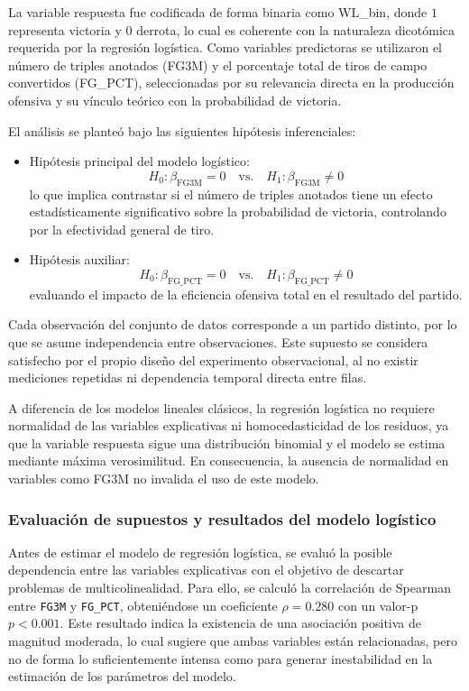 \documentclass[12pt]{article}
\begin{document}
La variable respuesta fue codificada de forma binaria como
WL\_bin, donde $1$ representa victoria y $0$ derrota, lo cual es
coherente con la naturaleza dicotómica requerida por la regresión logística.
Como variables predictoras se utilizaron el número de triples anotados
(FG3M) y el porcentaje total de tiros de campo convertidos
(FG\_PCT), seleccionadas por su relevancia directa en la producción
ofensiva y su vínculo teórico con la probabilidad de victoria.


El análisis se planteó bajo las siguientes hipótesis inferenciales:

\begin{itemize}
    \item Hipótesis principal del modelo logístico:
    \[
    H_0: \beta_{\text{FG3M}} = 0 \quad \text{vs.} \quad H_1: \beta_{\text{FG3M}} \neq 0
    \]
    lo que implica contrastar si el número de triples anotados tiene un efecto
    estadísticamente significativo sobre la probabilidad de victoria,
    controlando por la efectividad general de tiro.

    \item Hipótesis auxiliar:
    \[
    H_0: \beta_{\text{FG\_PCT}} = 0 \quad \text{vs.} \quad H_1: \beta_{\text{FG\_PCT}} \neq 0
    \]
    evaluando el impacto de la eficiencia ofensiva total en el resultado del
    partido.
\end{itemize}

Cada observación del conjunto de datos corresponde a un partido distinto,
por lo que se asume independencia entre observaciones. Este supuesto se
considera satisfecho por el propio diseño del experimento observacional,
al no existir mediciones repetidas ni dependencia temporal directa entre filas.


A diferencia de los modelos lineales clásicos, la regresión logística no
requiere normalidad de las variables explicativas ni homocedasticidad de los
residuos, ya que la variable respuesta sigue una distribución binomial y el
modelo se estima mediante máxima verosimilitud. En consecuencia, la ausencia
de normalidad en variables como FG3M no invalida el uso de este modelo.

\subsubsection{Evaluación de supuestos y resultados del modelo logístico}


Antes de estimar el modelo de regresión logística, se evaluó la posible dependencia
entre las variables explicativas con el objetivo de descartar problemas de
multicolinealidad. Para ello, se calculó la correlación de Spearman entre
\texttt{FG3M} y \texttt{FG\_PCT}, obteniéndose un coeficiente
$\rho = 0.280$ con un valor-p $p < 0.001$. Este resultado indica la existencia de
una asociación positiva de magnitud moderada, lo cual sugiere que ambas variables
están relacionadas, pero no de forma lo suficientemente intensa como para generar
inestabilidad en la estimación de los parámetros del modelo.
\end{document}
